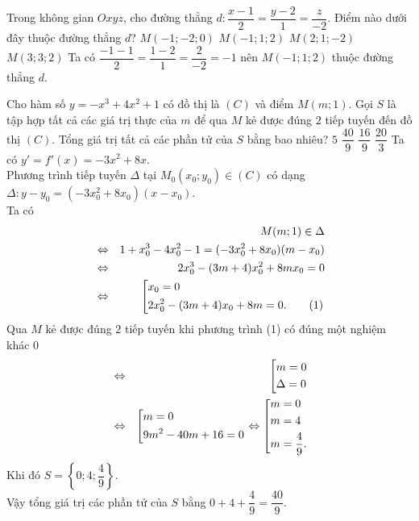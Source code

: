 \begin{ex}%
	Trong không gian $Oxyz$, cho đường thẳng $d\colon\dfrac{x-1}{2}=\dfrac{y-2}{1}=\dfrac{z}{-2}$. Điểm nào dưới đây thuộc đường thẳng $d$?
	\choice
	{$M(-1;-2;0)$}
	{\True $M(-1;1;2)$}
	{$M(2;1;-2)$}
	{$M(3;3;2)$}
	\loigiai
	{
		Ta có $\dfrac{-1-1}{2}=\dfrac{1-2}{1}=\dfrac{2}{-2}=-1$ nên $M(-1;1;2)$ thuộc đường thẳng $d$.
	}
\end{ex}

\begin{ex}%
	Cho hàm số $y=-x^3+4x^2+1$ có đồ thị là $(C)$ và điểm $M(m;1)$. Gọi $S$ là tập hợp tất cả các giá trị thực của $m$ để qua $M$ kẻ được đúng $2$ tiếp tuyến đến đồ thị $(C)$. Tổng giá trị tất cả các phần tử của $S$ bằng bao nhiêu?
	\choice
	{$5$}
	{\True $\dfrac{40}{9}$}
	{$\dfrac{16}{9}$}
	{$\dfrac{20}{3}$}
	\loigiai
	{
		Ta có $y'=f'(x)=-3x^2+8x$.\\
		Phương trình tiếp tuyến $\Delta$ tại $M_0(x_0;y_0)\in(C)$ có dạng $\Delta\colon y-y_0=(-3x_0^2+8x_0)(x-x_0)$.\\
		Ta có
		\begin{eqnarray*}
			& &M(m;1) \in \Delta\\
			& \Leftrightarrow & 1+x^3_0-4x^2_0-1=(-3x_0^2+8x_0)(m-x_0) \\
			& \Leftrightarrow & 2x_0^3-(3m+4)x_0^2+8mx_0=0\\
			& \Leftrightarrow &\left[\begin{aligned}&x_0=0\\&2x_0^2-(3m+4)x_0+8m=0.\qquad(1)\end{aligned}\right.
		\end{eqnarray*}
	Qua $M$ kẻ được đúng $2$ tiếp tuyến khi phương trình (1) có đúng một nghiệm khác $0$
	\begin{eqnarray*}
		& \Leftrightarrow & \left[\begin{aligned}&m=0\\&\Delta=0\end{aligned}\right.\\
		& \Leftrightarrow & \left[\begin{aligned}&m=0\\&9m^2-40m+16=0\end{aligned}\right.\Leftrightarrow \left[\begin{aligned}&m=0\\&m=4\\&m=\dfrac{4}{9}.\end{aligned}\right.
	\end{eqnarray*}
	Khi đó $S=\left\lbrace0;4;\dfrac{4}{9}\right\rbrace$.\\
	Vậy tổng giá trị các phần tử của $S$ bằng $0+4+\dfrac{4}{9}=\dfrac{40}{9}$.
	}
\end{ex}

